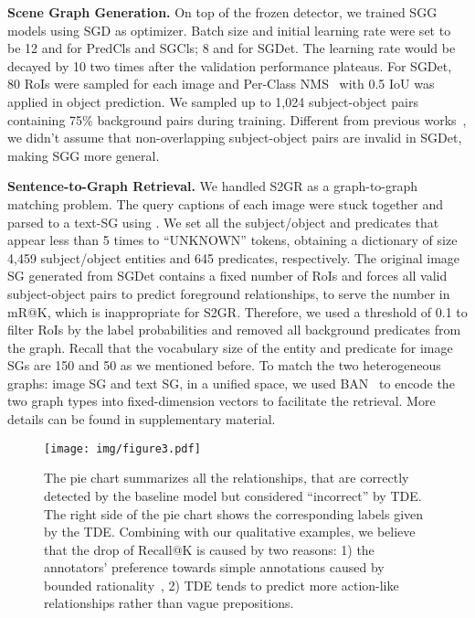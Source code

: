 \documentclass[10pt,twocolumn,letterpaper]{article}
\begin{document}
\noindent\textbf{Scene Graph Generation.} On top of the frozen detector, we trained SGG models using SGD as optimizer. Batch size and initial learning rate were set to be 12 and  for PredCls and SGCls; 8 and  for SGDet. The learning rate would be decayed by 10 two times after the validation performance plateaus. For SGDet, 80 RoIs were sampled for each image and Per-Class NMS~\cite{rosenfeld1971edge, zellers2018neural} with 0.5 IoU was applied in object prediction. We sampled up to 1,024 subject-object pairs containing 75\% background pairs during training. Different from previous works~\cite{zellers2018neural, tang2019learning, chen2019counterfactual}, we didn't assume that non-overlapping subject-object pairs are invalid in SGDet, making SGG more general.


\noindent\textbf{Sentence-to-Graph Retrieval.} We handled S2GR as a graph-to-graph matching problem. The query captions of each image were stuck together and parsed to a text-SG using \cite{schuster2015generating}. We set all the subject/object and predicates that appear less than 5 times to ``UNKNOWN'' tokens, obtaining a dictionary of size 4,459 subject/object entities and 645 predicates, respectively. The original image SG generated from SGDet contains a fixed number of RoIs and forces all valid subject-object pairs to predict foreground relationships, to serve the  number in mR@K, which is inappropriate for S2GR. Therefore, we used a threshold of 0.1 to filter RoIs by the label probabilities and removed all background predicates from the graph. Recall that the vocabulary size of the entity and predicate for image SGs are 150 and 50 as we mentioned before. To match the two heterogeneous graphs: image SG and text SG, in a unified space, we used BAN~\cite{kim2018bilinear} to encode the two graph types into fixed-dimension vectors to facilitate the retrieval. More details can be found in supplementary material.


\begin{figure}[t]
   \begin{minipage}[b]{1.0\linewidth}
   \centerline{\texttt{[image: img/figure3.pdf]}}
   \end{minipage}
   \caption{The pie chart summarizes all the relationships, that are correctly detected by the baseline model but considered ``incorrect'' by TDE.  The right side of the pie chart shows the corresponding labels given by the TDE. Combining with our qualitative examples, we believe that the drop of Recall@K is caused by two reasons: 1) the annotators’ preference towards simple annotations caused by bounded rationality~\cite{simon1990bounded}, 2) TDE tends to predict more action-like relationships rather than vague prepositions.}
   \label{fig:5} \vspace{-0.2in}
\end{figure}
\end{document}
